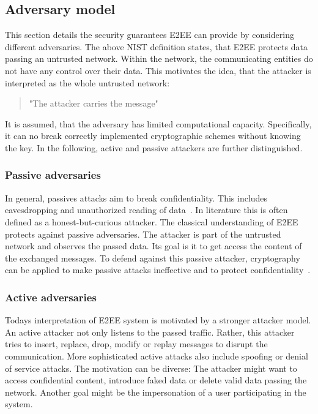\documentclass[../main.tex]{subfiles}
\begin{document}
\subsection{Adversary model}
This section details the security guarantees E2EE can provide by considering different adversaries.
The above NIST definition states, that E2EE protects data passing an untrusted network.
Within the network, the communicating entities do not have any control over their data.
This motivates the idea, that the attacker is interpreted as the whole untrusted network:
\begin{quote}
    "The attacker carries the message" 
\end{quote}
It is assumed, that the adversary has limited computational capacity. 
Specifically, it can no break correctly implemented cryptographic schemes without knowing the key.
In the following, active and passive attackers are further distinguished. 

\subsubsection{Passive adversaries}
In general, passives attacks aim to break confidentiality.
This includes eavesdropping and unauthorized reading of data~\cite{Eckert2018}. 
In literature this is often defined as a honest-but-curious attacker. 
The classical understanding of E2EE protects against passive adversaries. 
The attacker is part of the untrusted network and observes the passed data.
Its goal is it to get access the content of the exchanged messages.
To defend against this passive attacker, cryptography can be applied to make passive attacks ineffective and to protect confidentiality~\cite{Eckert2018}.


\subsubsection{Active adversaries}
Todays interpretation of E2EE system is motivated by a stronger attacker model.
An active attacker not only listens to the passed traffic.
Rather, this attacker tries to insert, replace, drop, modify or replay messages to disrupt the communication.
More sophisticated active attacks also include spoofing or denial of service attacks.
The motivation can be diverse: 
The attacker might want to access confidential content, introduce faked data or delete valid data passing the network.
Another goal might be the impersonation of a user participating in the system.~\cite{Eckert2018}
\end{document}

